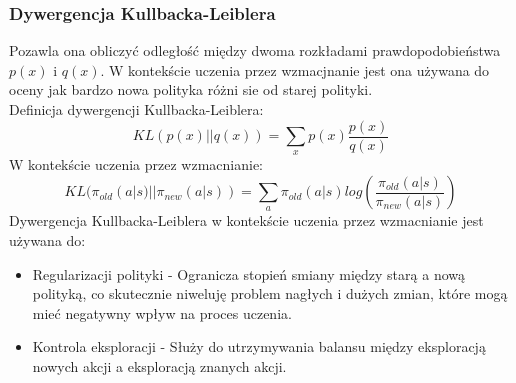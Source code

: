 \documentclass[a4paper, 10pt]{article}
\begin{document}
    \subsubsection{Dywergencja Kullbacka-Leiblera}
    Pozawla ona obliczyć odległość między dwoma rozkładami prawdopodobieństwa \( p(x) \) i \( q(x) \). W kontekście uczenia przez wzmacjnanie jest ona używana
    do oceny jak bardzo nowa polityka różni sie od starej polityki. 
    \\ Definicja dywergencji Kullbacka-Leiblera:
    \[ KL(p(x) || q(x)) = \sum_{x} p(x) \frac{p(x)}{q(x)}\]
    W kontekście uczenia przez wzmacnianie:
    \[ KL(\pi_{old}(a|s) || \pi_{new}(a|s)) = \sum_{a} \pi_{old}(a|s) log(\frac{\pi_{old}(a|s)}{\pi_{new}(a|s)})\]
    Dywergencja Kullbacka-Leiblera w kontekście uczenia przez wzmacnianie jest używana do:
    \begin{itemize}
        \item Regularizacji polityki - Ogranicza stopień smiany między starą a nową polityką, co skutecznie niweluję problem nagłych i dużych zmian,
        które mogą mieć negatywny wpływ na proces uczenia.
        \item Kontrola eksploracji - Służy do utrzymywania balansu między eksploracją nowych akcji a eksploracją znanych akcji.
    \end{itemize}
\end{document}
